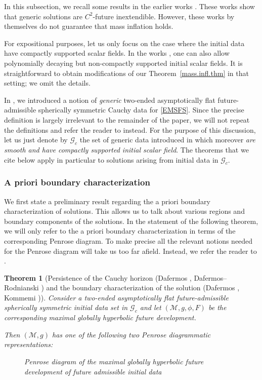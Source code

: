 \documentclass[10pt, reqno]{amsart}
\newtheorem{theorem}{Theorem}[section]
\theoremstyle{definition}
\theoremstyle{remark}
\numberwithin{equation}{section}
\newcommand{\0}{\emptyset}
\newcommand{\calM}{\mathcal M}
\begin{document}
In this subsection, we recall some results in the earlier works \cite{LO.interior, LO.exterior}. These works show that generic solutions are $C^2$-future inextendible. However, these works by themselves do not guarantee that mass inflation holds.

For expositional purposes, let us only focus on the case where the initial data have compactly supported scalar fields. In the works \cite{LO.interior, LO.exterior}, one can also allow polynomially decaying but non-compactly supported initial scalar fields. It is straightforward to obtain modifications of our Theorem~\ref{mass.infl.thm} in that setting; we omit the details.

In \cite{LO.interior}, we introduced a notion of \emph{generic} two-ended asymptotically flat future-admissible spherically symmetric Cauchy data for \eqref{EMSFS}. Since the precise definition is largely irrelevant to the remainder of the paper, we will not repeat the definitions and refer the reader to \cite[Sections~3.1--3.3]{LO.interior} instead. For the purpose of this discussion, let us just denote by $\mathcal G_c$ the set of generic data introduced in \cite{LO.interior} which moreover \emph{are smooth and have compactly supported initial scalar field}. The theorems that we cite below apply in particular to solutions arising from initial data in $\mathcal G_c$.

\subsubsection{A priori boundary characterization} We first state a preliminary result regarding the a priori boundary characterization of solutions. This allows us to talk about various regions and boundary components of the solutions. In the statement of the following theorem, we will only refer to the a priori boundary characterization in terms of the corresponding Penrose diagram. To make precise all the relevant notions needed for the Penrose diagram will take us too far afield. Instead, we refer the reader to \cite[Theorem~4.1]{LO.interior}.
\begin{theorem}[Persistence of the Cauchy horizon (Dafermos \cite{D2}, Dafermos--Rodnianski \cite{DRPL}) and the boundary characterization of the solution (Dafermos \cite{D3}, Kommemi \cite{Kommemi})]\label{thm:Kommemi}
Consider a two-ended asymptotically flat future-admissible spherically symmetric initial data set in $\mathcal G_c$ and let $(\calM, g, \phi, F)$ be the corresponding maximal globally hyperbolic future development.

Then $(\calM, g)$ has one of the following two Penrose diagrammatic representations:
\begin{figure}[h] \label{fig:main.structure}
\begin{center}
\def\svgwidth{450px}
 
\caption{Penrose diagram of the maximal globally hyperbolic future development of future admissible initial data} 
\end{center}
\end{figure}
\end{theorem}
\end{document}
